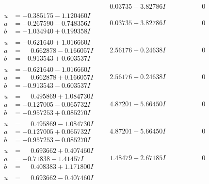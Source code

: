 \documentclass[1p]{elsarticle_modified}
\theoremstyle{definition}
\begin{document}
$$\begin{array}{c|c|c}
 & \phantom{-}0.03735 - 3.82786 I & \phantom{-0.000000 } 0 \\ \hline\begin{aligned}
u &= -0.385175 - 1.120460 I \\
a &= -0.267590 - 0.748356 I \\
b &= -1.034940 + 0.199358 I\end{aligned}
 & \phantom{-}0.03735 + 3.82786 I & \phantom{-0.000000 } 0 \\ \hline\begin{aligned}
u &= -0.621640 + 1.016660 I \\
a &= \phantom{-}0.662878 - 0.166057 I \\
b &= -0.913543 + 0.603537 I\end{aligned}
 & \phantom{-}2.56176 + 0.24638 I & \phantom{-0.000000 } 0 \\ \hline\begin{aligned}
u &= -0.621640 - 1.016660 I \\
a &= \phantom{-}0.662878 + 0.166057 I \\
b &= -0.913543 - 0.603537 I\end{aligned}
 & \phantom{-}2.56176 - 0.24638 I & \phantom{-0.000000 } 0 \\ \hline\begin{aligned}
u &= \phantom{-}0.495869 + 1.084730 I \\
a &= -0.127005 - 0.065732 I \\
b &= -0.957253 + 0.085270 I\end{aligned}
 & \phantom{-}4.87201 + 5.66450 I & \phantom{-0.000000 } 0 \\ \hline\begin{aligned}
u &= \phantom{-}0.495869 - 1.084730 I \\
a &= -0.127005 + 0.065732 I \\
b &= -0.957253 - 0.085270 I\end{aligned}
 & \phantom{-}4.87201 - 5.66450 I & \phantom{-0.000000 } 0 \\ \hline\begin{aligned}
u &= \phantom{-}0.693662 + 0.407460 I \\
a &= -0.71838 - 1.41457 I \\
b &= \phantom{-}0.408383 + 1.171800 I\end{aligned}
 & \phantom{-}1.48479 - 2.67185 I & \phantom{-0.000000 } 0 \\ \hline\begin{aligned}
u &= \phantom{-}0.693662 - 0.407460 I \\

\end{aligned}
\end{array}$$
\end{document}

